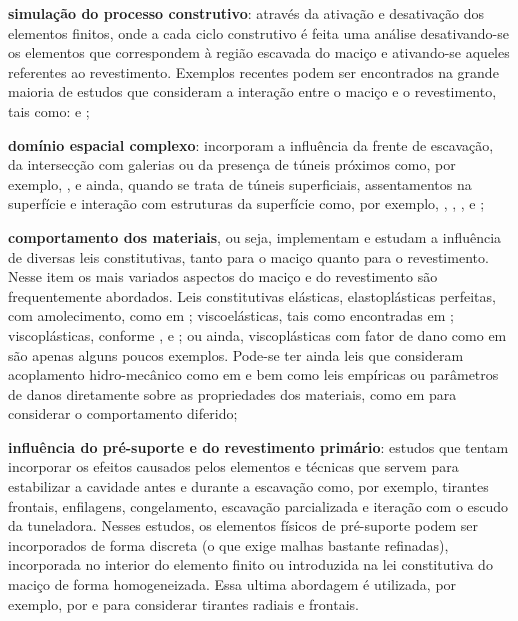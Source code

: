 \begin{alineas}
	
	\item \textbf{simulação do processo construtivo}: através da ativação e desativação dos elementos finitos, onde a cada ciclo construtivo é feita uma análise desativando-se os elementos que correspondem à região escavada do maciço e ativando-se aqueles referentes ao revestimento. Exemplos recentes podem ser encontrados na grande maioria de estudos que consideram a interação entre o maciço e o revestimento, tais como:  e ;
	
	\item \textbf{domínio espacial complexo}: incorporam a influência da frente de escavação, da intersecção com galerias ou da presença de túneis próximos como, por exemplo, ,   e ainda, quando se trata de túneis superficiais, assentamentos na superfície e interação com estruturas da superfície como, por exemplo, , , ,  e ;
	
	\item \textbf{comportamento dos materiais}, ou seja, implementam e estudam a influência de diversas leis constitutivas, tanto para o maciço quanto para o revestimento. Nesse item os mais variados aspectos do maciço e do revestimento são frequentemente abordados. Leis constitutivas elásticas, elastoplásticas perfeitas, com amolecimento, como em ; viscoelásticas, tais como encontradas em ; viscoplásticas, conforme ,  e ; ou ainda, viscoplásticas com fator de dano como em  são apenas alguns poucos exemplos. Pode-se ter ainda leis que consideram acoplamento hidro-mecânico como em  e  bem como leis empíricas ou parâmetros de danos diretamente sobre as propriedades dos materiais, como em  para considerar o comportamento diferido;
	
	\item \textbf{influência do pré-suporte e do revestimento primário}: estudos que tentam incorporar os efeitos causados pelos elementos e técnicas que servem para estabilizar a cavidade antes e durante a escavação como, por exemplo, tirantes frontais, enfilagens, congelamento, escavação parcializada e iteração com o escudo da tuneladora. Nesses estudos, os elementos físicos de pré-suporte podem ser incorporados de forma discreta (o que exige malhas bastante refinadas), incorporada no interior do elemento finito ou introduzida na lei constitutiva do maciço de forma homogeneizada. Essa ultima abordagem é utilizada, por exemplo, por  e  para considerar tirantes radiais e frontais.
	

\end{alineas}
